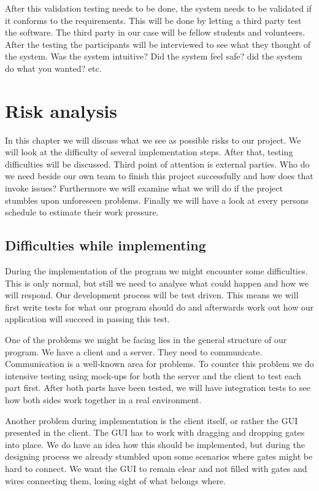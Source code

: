 \documentclass[a4paper]{article}
\begin{document}

After this validation testing needs to be done, the system needs to be validated if it conforms to the requirements. This will be done by letting a third party test the software. The third party in our case will be fellow students and volunteers. After the testing the participants will be interviewed to see what they thought of the system. Was the system intuitive? Did the system feel safe? did the system do what you wanted? etc.

\section{Risk analysis}
In this chapter we will discuss what we see as possible risks to our project. We will look at the difficulty of several implementation steps. After that, testing difficulties will be discussed. Third point of attention is external parties. Who do we need beside our own team to finish this project successfully and how does that invoke issues? Furthermore we will examine what we will do if the project stumbles upon unforeseen problems. Finally we will have a look at every persons schedule to estimate their work pressure.

\subsection{Difficulties while implementing}
During the implementation of the program we might encounter some difficulties. This is only normal, but still we need to analyse what could happen and how we will respond. Our development process will be test driven. This means we will first write tests for what our program should do and afterwards work out how our application will succeed in passing this test.
 
One of the problems we might be facing lies in the general structure of our program. We have a client and a server. They need to communicate. Communication is a well-known area for problems. To counter this problem we do intensive testing using mock-ups for both the server and the client to test each part first. After both parts have been tested, we will have integration tests to see how both sides work together in a real environment. 

Another problem during implementation is the client itself, or rather the GUI presented in the client. The GUI has to work with dragging and dropping gates into place. We do have an idea how this should be implemented, but during the designing process we already stumbled upon some scenarios where gates might be hard to connect. We want the GUI to remain clear and not filled with gates and wires connecting them, losing sight of what belongs where.
\end{document}
